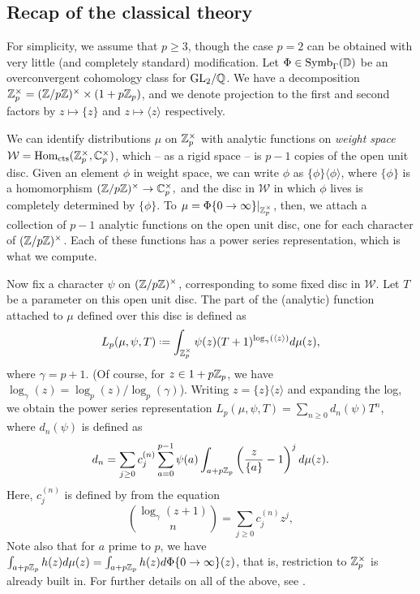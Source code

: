\documentclass[a4paper,10pt]{article}
\newcommand{\W}{\mathcal{W}}
\numberwithin{equation}{section}
\begin{document}
\subsection{Recap of the classical theory}

For simplicity, we assume that $p \geq 3$, though the case $p = 2$ can be obtained with very little (and completely standard) modification. Let $\Phi \in \mathrm{Symb}_\Gamma(\mathbb{D})$ be an overconvergent cohomology class for $\mathrm{GL}_2/\mathbb{Q}$. We have a decomposition $\mathbb{Z}_p^\times = (\mathbb{Z}/p\mathbb{Z})^\times \times (1+p\mathbb{Z}_p)$, and we denote projection to the first and second factors by $z \mapsto \{z\}$ and $z \mapsto \langle z\rangle$ respectively. 

We can identify distributions $\mu$ on $\mathbb{Z}_p^\times$ with analytic functions on \emph{weight space} $\W = \mathrm{Hom}_{\mathrm{cts}}(\Zp^\times, \C_p^\times)$, which -- as a rigid space -- is $p-1$ copies of the open unit disc. Given an element $\phi$ in weight space, we can write $\phi$ as $\{\phi\}\langle\phi\rangle$, where $\{\phi\}$ is a homomorphism $(\mathbb{Z}/p\mathbb{Z})^\times \rightarrow \mathbb{C}_p^\times,$ and the disc in $\W$ in which $\phi$ lives is completely determined by $\{\phi\}$. To $\mu = \Phi\{0\rightarrow\infty\}|_{\mathbb{Z}_p^\times}$, then, we attach a collection of $p-1$ analytic functions on the open unit disc, one for each character of $(\mathbb{Z}/p\mathbb{Z})^\times$. Each of these functions has a power series representation, which is what we compute.

Now fix a character $\psi$ on $(\mathbb{Z}/p\mathbb{Z})^\times$, corresponding to some fixed disc in $\W$. Let $T$ be a parameter on this open unit disc.  The part of the (analytic) function attached to $\mu$ defined over this disc is defined as
\[
	L_p(\mu, \psi, T) \defeq \int_{\Zp^\times} \psi(z)(T+1)^{\log_{\gamma}(\langle z\rangle)} d\mu(z),
\]
 where $\gamma=p+1$. (Of course, for $z \in 1 + p\mathbb{Z}_p$, we have $\log_\gamma(z) = \log_p(z) / \log_p(\gamma)$). Writing $z = \{z\}\langle z\rangle$ and expanding the log, we obtain the power series representation $L_p(\mu,\psi,T) = \sum_{n\geq 0} d_n(\psi)T^n$, where $d_n(\psi)$ is defined as
\[
  d_n=\sum_{j\geq 0} c_j^{(n)} \sum_{a=0}^{p-1}\psi(a) \int_{a+p\mathbb{Z}_p} \left(\frac{z}{\{a\}}-1\right)^j d\mu(z).
\]
Here, $c_j^{(n)}$ is defined by from the equation
\[
  \binom{\log_{\gamma}(z+1)}{n} = \sum_{j\geq 0} c_j^{(n)} z^j,
  \]
Note also that for $a$ prime to $p$, we have $\int_{a+p\mathbb{Z}_p}h(z) d\mu(z) = \int_{a+p\mathbb{Z}_p}h(z)d\Phi\{0\to\infty\}(z)$, that is, restriction to $\mathbb{Z}_p^\times$ is already built in. For further details on all of the above, see \cite[\S9]{PS11}.
\end{document}
